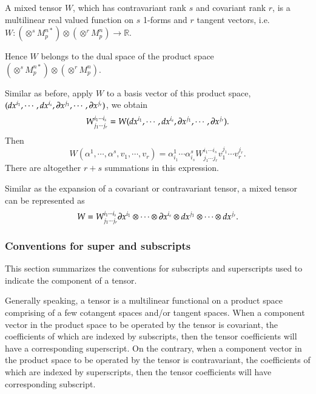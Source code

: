 \documentclass[11pt, a4paper]{book}
\begin{document}
\begin{Definition}
  A mixed tensor $W$, which has contravariant rank $s$ and covariant rank $r$, is a
  multilinear real valued function on $s$ 1-forms and $r$ tangent vectors, i.e.
  $W:\left( \otimes^s M_p^{n*} \right) \otimes \left( \otimes^r M_p^n \right) \rightarrow
  \mathbb{R}$.
\end{Definition}
Hence $W$ belongs to the dual space of the product space
$\left( \otimes^s M_p^{n*} \right) \otimes \left( \otimes^r M_p^n \right)$.

Similar as before, apply $W$ to a basis vector of this product space,
$(dx^{i_1},\cdots,dx^{i_s},\boldsymbol{\partial}x^{j_1},\cdots,\boldsymbol{\partial}x^{j_r})$, we obtain
\begin{equation}
  W^{i_1\cdots i_s}_{j_1\cdots j_r} = W(dx^{i_1},\cdots,dx^{i_s},\boldsymbol{\partial}x^{j_1},\cdots,\boldsymbol{\partial}x^{j_r}).
\end{equation}
Then
\begin{equation}
  W(\alpha^1,\cdots,\alpha^s,v_1,\cdots,v_r) = \alpha_{i_1}^1\cdots \alpha_{i_s}^s
  W^{i_1\cdots i_s}_{j_1\cdots j_r} v_1^{j_1}\cdots v_r^{j_r}.
\end{equation}
There are altogether $r+s$ summations in this expression.

Similar as the expansion of a covariant or contravariant tensor, a mixed tensor can be
represented as
\begin{equation}
  \label{eq:mixed-tensor-expanded-as-tensor-product}
  W = W^{i_1\cdots i_s}_{j_1\cdots j_r} \boldsymbol{\partial}x^{i_1}\otimes\cdots\otimes
  \boldsymbol{\partial}x^{i_s}\otimes dx^{j_1}\otimes\cdots\otimes dx^{j_r}.
\end{equation}

\subsubsection{Conventions for super and subscripts}

This section summarizes the conventions for subscripts and superscripts used to indicate
the component of a tensor.

Generally speaking, a tensor is a multilinear functional on a product space comprising of
a few cotangent spaces and/or tangent spaces. When a component vector in the product space
to be operated by the tensor is covariant, the coefficients of which are indexed by subscripts, then
the tensor coefficients will have a corresponding superscript. On the contrary, when a
component vector in the product space to be operated by the tensor is contravariant, the
coefficients of which are indexed by superscripts, then the tensor coefficients will have
corresponding subscript.
\end{document}
